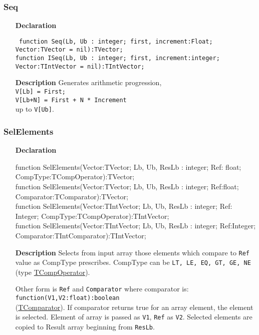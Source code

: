 \documentclass[12pt,a4paper,oneside]{report}
\newcommand{\declarationitem}[1]{\textbf{#1}}
\newcommand{\descriptiontitle}[1]{\textbf{#1}}
\newcommand{\code}[1]{\texttt{#1}}
\begin{document}
\subsubsection{Seq}
\label{uvecutils:seq}
\begin{itemize}
	\item[\declarationitem{Declaration}\hfill]
	\begin{flushleft}
\code{	function Seq(Lb, Ub : integer; first, increment:Float; Vector:TVector = nil):TVector;\\
	\vspace{4pt}
	function ISeq(Lb, Ub : integer; first, increment:integer; Vector:TIntVector = nil):TIntVector;
}	\end{flushleft}
	\item[\descriptiontitle{Description}\hfill]
	Generates arithmetic progression,\\
	 \code{V[Lb] = First; \\ V[Lb+N] = First + N * Increment}\\
	  up to \code{V[Ub]}. 
\end{itemize}
\subsubsection{SelElements}
\label{uvecutils:SelElements}
\begin{itemize}
	\item[\declarationitem{Declaration}\hfill]
	\begin{flushleft}
function SelElements(Vector:TVector; Lb, Ub, ResLb : integer; Ref: float; CompType:TCompOperator):TVector;\\
\vspace{4pt}
function SelElements(Vector:TVector; Lb, Ub, ResLb : integer; Ref:float; Comparator:TComparator):TVector;\\
\vspace{12pt}
function SelElements(Vector:TIntVector; Lb, Ub, ResLb : integer; Ref: Integer; CompType:TCompOperator):TIntVector; \\ \vspace{4pt}
function SelElements(Vector:TIntVector; Lb, Ub, ResLb : integer; Ref:Integer; Comparator:TIntComparator):TIntVector;
\end{flushleft}
	\item[\descriptiontitle{Description}\hfill]
Selects from input array those elements which compare to \code{Ref} value as CompType prescribes. CompType can be \code{LT, LE, EQ, GT, GE, NE} (type \hyperref[utypes-TCompOperator]{TCompOperator}).

Other form is \code{Ref} and \code{Comparator} where comparator is:\\ \code{function(V1,V2:float):boolean}\\ (\hyperref[utypes-TComparator]{TComparator}).
If comparator returns true for an array element, the element is selected. Element of array is passed as \code{V1}, \code{Ref} as \code{V2}.
Selected elements are copied to Result array beginning from \code{ResLb}.
\end{itemize}
\end{document}
